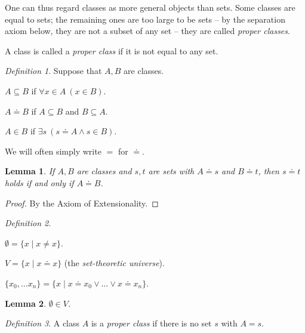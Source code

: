 \documentclass[a4paper, 11pt]{amsart}
\newtheorem{lemma}[lemma]{Lemma}
\theoremstyle{remark}
\newtheorem{definition}[definition]{Definition}
\newenvironment{enumerate-(1)}{\begin{enumerate}[label={\upshape (\arabic*)}, leftmargin=2pc]}{\end{enumerate}}
\begin{document}
One can thus regard classes as more general objects than sets. Some classes are equal to sets; the remaining ones are too large to be sets -- by the separation axiom below, they are not a subset of any set -- they are called \emph{proper classes}. 

A class is called a \emph{proper class} if it is not equal to any set. 

\begin{definition} 
Suppose that $A, B$ are classes. 
\begin{enumerate-(1)} 
\item 
$A\subseteq B$ if $\forall x\in A\ (x\in B)$. 
\item 
$A\doteq B$ if $A\subseteq B$ and $B\subseteq A$. 
\item 
$A\in B$ if $\exists s \ (s\doteq A \wedge s\in B)$. 
\end{enumerate-(1)} 
\end{definition} 

We will often simply write $=$ for $\doteq$. 

\begin{lemma} 
If $A, B$ are classes and $s,t$ are sets with $A\doteq s$ and $B\doteq t$, then $s\doteq t$ holds if and only if $A\doteq B$. 
\end{lemma} 
\begin{proof} 
By the Axiom of Extensionality. 
\end{proof}

\begin{definition} \ 
\label{definition universe} 
\begin{enumerate-(1)} 
\item 
$\emptyset=\{x \mid x\neq x\}$. 
\item 
$V=\{x \mid x\doteq x \}$ (the \emph{set-theoretic universe}). 
\item 
$\{x_0,\dots x_n \}= \{x\mid x\doteq x_0 \vee \dots \vee x\doteq x_n \}$. 
\end{enumerate-(1)} 
\end{definition} 

\begin{lemma} 
$\emptyset \in V$. 
\end{lemma} 

\begin{definition} 
A class $A$ is a \emph{proper class} if there is no set $s$ with $A=s$. 
\end{definition} 
\end{document}
